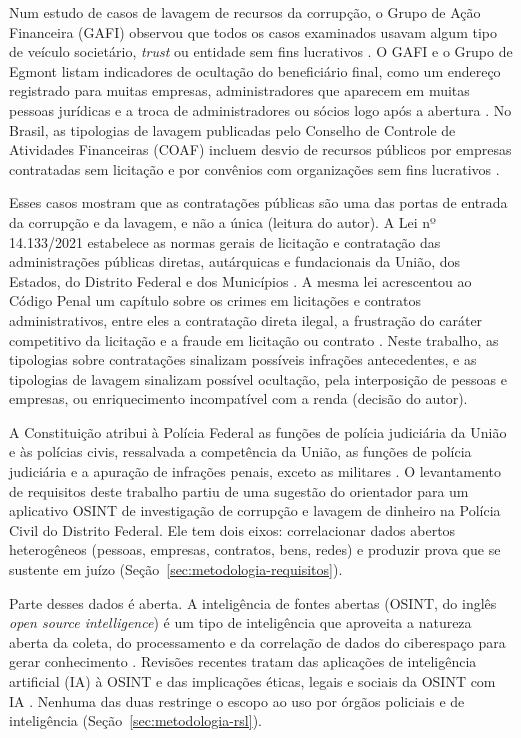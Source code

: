 Num estudo de casos de lavagem de recursos da corrupção, o Grupo de Ação
Financeira (GAFI) observou
que todos os casos examinados usavam algum tipo de veículo societário,
\textit{trust} ou entidade sem fins lucrativos \cite[§ 47]{fatf2011corruption}.
O GAFI e o Grupo de Egmont listam indicadores de ocultação do beneficiário
final, como um endereço registrado para muitas empresas, administradores que
aparecem em muitas pessoas jurídicas e a troca de administradores ou sócios
logo após a abertura
\cite[anexo E]{fatfegmont2018}. No Brasil, as tipologias de lavagem
publicadas pelo Conselho de Controle de Atividades Financeiras (COAF) incluem
desvio de recursos públicos por empresas contratadas sem licitação e por
convênios com organizações sem fins lucrativos
\cite[tipologias 2.1, 2.7 e 2.8]{coaf2021casos}.

Esses casos mostram que as contratações públicas são uma das portas de
entrada da corrupção e da lavagem, e não a única (leitura do autor). A Lei nº 14.133/2021 estabelece as normas gerais de licitação e
contratação das administrações públicas diretas, autárquicas e fundacionais
da União, dos Estados, do Distrito Federal e dos Municípios
\cite[art. 1º]{brasil2021lei14133}. A mesma lei acrescentou ao Código Penal
um capítulo sobre os crimes em licitações e contratos administrativos, entre
eles a contratação direta ilegal, a frustração do caráter competitivo da
licitação e a fraude em licitação ou contrato
\cite[art. 178]{brasil2021lei14133}. Neste trabalho, as tipologias sobre
contratações sinalizam possíveis infrações antecedentes, e as tipologias de
lavagem sinalizam possível ocultação, pela interposição de pessoas e
empresas, ou enriquecimento incompatível com a renda (decisão do autor).

A Constituição atribui à Polícia Federal as funções de polícia judiciária da União e às
polícias civis, ressalvada a competência da União, as funções de polícia
judiciária e a apuração de infrações penais, exceto as militares
\cite[art. 144, § 1º, IV, e § 4º]{brasil1988constituicao}. O levantamento
de requisitos deste trabalho partiu de uma sugestão do orientador para um
aplicativo OSINT de investigação de corrupção e lavagem de dinheiro na
Polícia Civil do Distrito Federal. Ele tem dois eixos: correlacionar dados
abertos heterogêneos (pessoas, empresas, contratos, bens, redes) e produzir
prova que se sustente em juízo (Seção~\ref{sec:metodologia-requisitos}).

Parte desses dados é aberta. A inteligência de fontes abertas (OSINT, do
inglês \textit{open source intelligence}) é um tipo de inteligência que
aproveita a natureza aberta da coleta, do processamento e da correlação de
dados do ciberespaço para gerar conhecimento \cite{pastorgalindo2020}. Revisões recentes tratam das aplicações de
inteligência artificial (IA) à OSINT \cite{browne2024} e das implicações
éticas, legais e sociais da OSINT com IA \cite{ghioni2024}. Nenhuma das duas
restringe o escopo ao uso por órgãos policiais e de inteligência
(Seção~\ref{sec:metodologia-rsl}).

